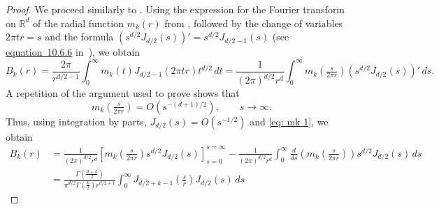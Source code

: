 \documentclass[a4paper,12pt,reqno]{amsart}
\numberwithin{equation}{section}
\theoremstyle{definition}
\newcommand{\R}{\mathbb{R}}
\begin{document}
\begin{proof}
We proceed similarly to \cite[Appendix 4.1]{LiuMeZhu}.
Using the expression for the Fourier transform on $\R^d$ of the radial function $m_k(r)$ from \cite[Section B.5]{grafakos}, followed by the change of variables $2\pi tr=s$ and the formula $(s^{d/2}J_{d/2}(s))'= s^{d/2} J_{d/2-1}(s)$ (see \href{https://dlmf.nist.gov/10.6.E6}{equation~10.6.6} in~\cite{dlmf}), we obtain
\begin{equation*}
    B_k(r)=\frac{2\pi}{r^{d/2-1}}\int_{0}^{\infty}m_k(t)J_{d/2-1}(2\pi tr)t^{d/2}\,dt=\frac{1}{(2\pi)^{d/2}r^{d}}\int_{0}^{\infty}m_k(\tfrac{s}{2\pi r}) (s^{d/2}J_{d/2}(s))' \, ds.
\end{equation*}
A repetition of the argument used to prove \cite[eq.\ (4.2)]{LiuMeZhu} shows that 
\[m_k(\tfrac{s}{2\pi r})=O(s^{-(d+1)/2}),\qquad s\to \infty.\]
Thus, using integration by parts, $J_{d/2}(s)=O(s^{-1/2})$ and \eqref{eq: mk 1}, we obtain
\begin{align*}
    B_k(r)&=\frac{1}{(2\pi)^{d/2}r^{d}}\left[m_k(\tfrac{s}{2\pi r})s^{d/2}J_{d/2}(s)\right]_{s=0}^{s=\infty}-\frac{1}{(2\pi)^{d/2}r^{d}}\int_{0}^{\infty}\frac{d}{ds}\left(m_k(\tfrac{s}{2\pi r})\right) s^{d/2}J_{d/2}(s) \, ds\\
    &=\frac{\Gamma(\frac{d + k}{2})}{\pi^{d/2}\Gamma(\frac{k}{2})r^{d/2+1}}\int_{0}^{\infty} J_{d/2+k-1}(\tfrac{s}{r})J_{d/2}(s) \, ds
\end{align*}


\end{proof}
\end{document}
